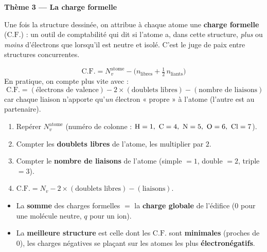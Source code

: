\documentclass[11pt,a4paper]{article}
\begin{document}
\newcommand{\CF}{\ensuremath{\mathrm{C.F.}}}
\begin{center}
{\Large\bfseries\color{primarydark} Thème 3 — La charge formelle}
\end{center}

\smallskip
Une fois la structure dessinée, on attribue à chaque atome une \textbf{charge formelle} (\CF) :
un outil de comptabilité qui dit si l'atome a, dans cette structure, \emph{plus} ou \emph{moins}
d'électrons que lorsqu'il est neutre et isolé. C'est le juge de paix entre structures concurrentes.

\begin{cle}
\[ \boxed{\;\CF = N_{v}^{\text{atome}} - \Big(n_{\text{libres}} + \tfrac{1}{2}\,n_{\text{liants}}\Big)\;} \]
En pratique, on compte plus vite avec :
\[ \boxed{\;\CF = (\text{électrons de valence}) - 2\times(\text{doublets libres}) - (\text{nombre de liaisons})\;} \]
car chaque liaison n'apporte qu'\emph{un} électron « propre » à l'atome (l'autre est au partenaire).
\end{cle}

\begin{methode}
\begin{enumerate}[leftmargin=1.9em,topsep=2pt,itemsep=1.5pt]
  \item Repérer $N_v^{\text{atome}}$ (numéro de colonne : $\ce{H}=1,\ \ce{C}=4,\ \ce{N}=5,\ \ce{O}=6,\ \ce{Cl}=7$).
  \item Compter les \textbf{doublets libres} de l'atome, les multiplier par $2$.
  \item Compter le \textbf{nombre de liaisons} de l'atome (simple $=1$, double $=2$, triple $=3$).
  \item $\CF = N_v - 2\times(\text{doublets libres}) - (\text{liaisons})$.
\end{enumerate}
\end{methode}

\begin{cle}
\begin{itemize}[leftmargin=1.5em,topsep=2pt,itemsep=2pt]
  \item La \textbf{somme} des charges formelles $=$ la \textbf{charge globale} de l'édifice
        ($0$ pour une molécule neutre, $q$ pour un ion).
  \item La \textbf{meilleure structure} est celle dont les \CF{} sont \textbf{minimales} (proches
        de $0$), les charges négatives se plaçant sur les atomes les plus \textbf{électronégatifs}.
\end{itemize}
\end{cle}
\end{document}
